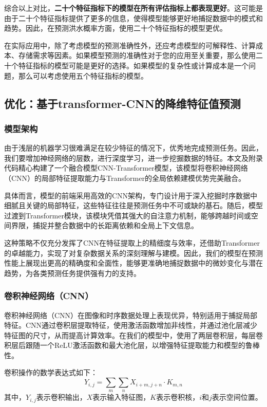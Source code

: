 \documentclass[withoutpreface,bwprint]{cumcmthesis} %
\begin{document}
	综合以上对比，\textbf{二十个特征指标下的模型在所有评估指标上都表现更好}。这可能是由于二十个特征指标提供了更多的信息，使得模型能够更好地捕捉数据中的模式和趋势。因此，在预测洪水概率方面，使用二十个特征指标的模型更优。
	
	在实际应用中，除了考虑模型的预测准确性外，还应考虑模型的可解释性、计算成本、存储需求等因素。如果模型预测的准确性对于您的应用至关重要，那么使用二十个特征指标的模型可能是更好的选择。如果模型的复杂性或计算成本是一个问题，那么可以考虑使用五个特征指标的模型。

\subsection{优化：基于transformer-CNN的降维特征值预测}
\subsubsection{模型架构}
由于浅层的机器学习很难满足在较少特征的情况下，优秀地完成预测任务。因此，我们要增加神经网络的层数，进行深度学习，进一步挖掘数据的特征。本文及附录代码精心构建了一个融合模型CNN-Transformer模型，该模型将卷积神经网络（CNN）的局部特征提取能力与Transformer的全局依赖建模优势完美融合。

具体而言，模型的前端采用高效的CNN架构，专门设计用于深入挖掘时序数据中细腻且关键的局部特征，这些特征往往是预测任务中不可或缺的基石。随后，模型过渡到Transformer模块，该模块凭借其强大的自注意力机制，能够跨越时间或空间界限，捕捉并整合数据中的长距离依赖和全局上下文信息。

这种策略不仅充分发挥了CNN在特征提取上的精细度与效率，还借助Transformer的卓越能力，实现了对复杂数据关系的深刻理解与建模。因此，我们的模型在预测性能上展现出更高的精确度和全面性，能够更准确地捕捉数据中的微妙变化与潜在趋势，为各类预测任务提供强有力的支持。

\subsubsection{卷积神经网络（CNN）}
卷积神经网络（CNN）在图像和时序数据处理上表现优异，特别适用于捕捉局部特征。CNN通过卷积层提取特征，使用激活函数增加非线性，并通过池化层减少特征图的尺寸，从而提高计算效率。在我们的模型中，使用了两层卷积层，每层卷积层后跟随一个ReLU激活函数和最大池化层，以增强特征提取能力和模型的鲁棒性。

卷积操作的数学表达式如下：
\begin{equation}
Y_{i,j} = \sum_{m}\sum_{n} X_{i+m,j+n} \cdot K_{m,n}
\end{equation}
其中，$Y_{i,j}$表示卷积输出，$X$表示输入特征图，$K$表示卷积核，$i$和$j$表示空间位置。
\end{document}
